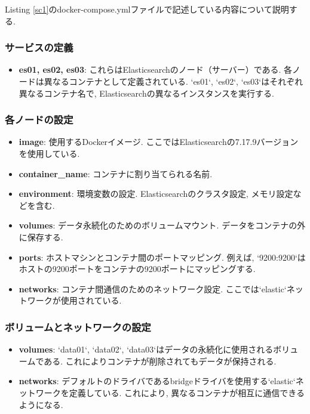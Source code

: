 \documentclass[a4j,12pt,]{jarticle}
\begin{document}
Listing \ref{sc1}のdocker-compose.ymlファイルで記述している内容について説明する.

\subsubsection*{サービスの定義}
\begin{itemize}
  \item \textbf{es01, es02, es03}: これらはElasticsearchのノード（サーバー）である. 各ノードは異なるコンテナとして定義されている. `es01`, `es02`, `es03`はそれぞれ異なるコンテナ名で, Elasticsearchの異なるインスタンスを実行する.
\end{itemize}

\subsubsection*{各ノードの設定}
\begin{itemize}
  \item \textbf{image}: 使用するDockerイメージ. ここではElasticsearchの7.17.9バージョンを使用している.
  \item \textbf{container\_name}: コンテナに割り当てられる名前.
  \item \textbf{environment}: 環境変数の設定. Elasticsearchのクラスタ設定, メモリ設定などを含む.
  \item \textbf{volumes}: データ永続化のためのボリュームマウント. データをコンテナの外に保存する.
  \item \textbf{ports}: ホストマシンとコンテナ間のポートマッピング. 例えば, `9200:9200`はホストの9200ポートをコンテナの9200ポートにマッピングする.
  \item \textbf{networks}: コンテナ間通信のためのネットワーク設定. ここでは`elastic`ネットワークが使用されている.
\end{itemize}

\subsubsection*{ボリュームとネットワークの設定}
\begin{itemize}
  \item \textbf{volumes}: `data01`, `data02`, `data03`はデータの永続化に使用されるボリュームである. これによりコンテナが削除されてもデータが保持される.
  \item \textbf{networks}: デフォルトのドライバであるbridgeドライバを使用する`elastic`ネットワークを定義している. これにより, 異なるコンテナが相互に通信できるようになる.
\end{itemize}
\end{document}
